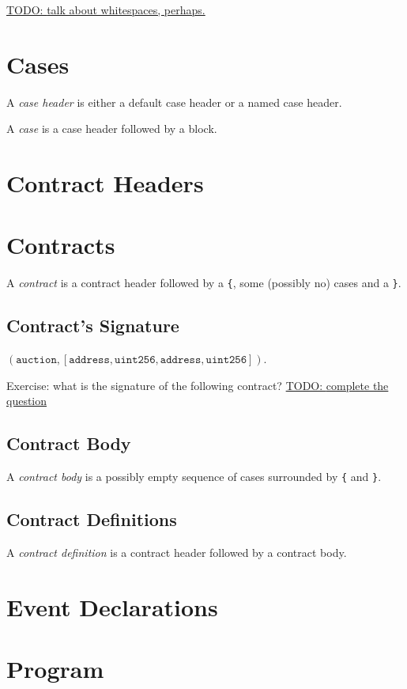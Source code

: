 \documentclass{book}
\newcommand{\todo}[1]{\underline{TODO: {#1}}}
\begin{document}
\todo{talk about whitespaces, perhaps.}

\section{Cases}

A \textit{case header} is either a default case header or a named case header.

A \textit{case} is a case header followed by a block.


\section{Contract Headers}

\section{Contracts}

A \textit{contract} is a contract header followed by a \texttt{\{}, some (possibly no) cases and a \texttt{\}}.

\subsection{Contract's Signature}

$(\mathtt{auction}, [\mathtt{address}, \mathtt{uint256}, \mathtt{address}, \mathtt{uint256}])$.

Exercise: what is the signature of the following contract?
\todo{complete the question}

\subsection{Contract Body}

A \textit{contract body} is a possibly empty sequence of cases surrounded by \texttt{\{} and \texttt{\}}.

\subsection{Contract Definitions}

A \textit{contract definition} is a contract header followed by a contract body.

\section{Event Declarations}

\section{Program}
\end{document}
